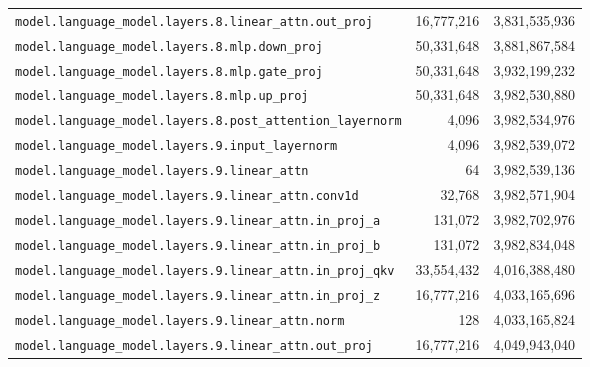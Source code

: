 \documentclass[10pt,a4paper]{article}
\theoremstyle{definition}
\begin{document}
\begin{appendices}
\begin{longtable}{p{9.5cm}rr}
\texttt{model.\allowbreak{}language\_model.\allowbreak{}layers.\allowbreak{}8.\allowbreak{}linear\_attn.\allowbreak{}out\_proj} & 16,777,216 & 3,831,535,936 \\
\texttt{model.\allowbreak{}language\_model.\allowbreak{}layers.\allowbreak{}8.\allowbreak{}mlp.\allowbreak{}down\_proj} & 50,331,648 & 3,881,867,584 \\
\texttt{model.\allowbreak{}language\_model.\allowbreak{}layers.\allowbreak{}8.\allowbreak{}mlp.\allowbreak{}gate\_proj} & 50,331,648 & 3,932,199,232 \\
\texttt{model.\allowbreak{}language\_model.\allowbreak{}layers.\allowbreak{}8.\allowbreak{}mlp.\allowbreak{}up\_proj} & 50,331,648 & 3,982,530,880 \\
\texttt{model.\allowbreak{}language\_model.\allowbreak{}layers.\allowbreak{}8.\allowbreak{}post\_attention\_layernorm} & 4,096 & 3,982,534,976 \\
\texttt{model.\allowbreak{}language\_model.\allowbreak{}layers.\allowbreak{}9.\allowbreak{}input\_layernorm} & 4,096 & 3,982,539,072 \\
\texttt{model.\allowbreak{}language\_model.\allowbreak{}layers.\allowbreak{}9.\allowbreak{}linear\_attn} & 64 & 3,982,539,136 \\
\texttt{model.\allowbreak{}language\_model.\allowbreak{}layers.\allowbreak{}9.\allowbreak{}linear\_attn.\allowbreak{}conv1d} & 32,768 & 3,982,571,904 \\
\texttt{model.\allowbreak{}language\_model.\allowbreak{}layers.\allowbreak{}9.\allowbreak{}linear\_attn.\allowbreak{}in\_proj\_a} & 131,072 & 3,982,702,976 \\
\texttt{model.\allowbreak{}language\_model.\allowbreak{}layers.\allowbreak{}9.\allowbreak{}linear\_attn.\allowbreak{}in\_proj\_b} & 131,072 & 3,982,834,048 \\
\texttt{model.\allowbreak{}language\_model.\allowbreak{}layers.\allowbreak{}9.\allowbreak{}linear\_attn.\allowbreak{}in\_proj\_qkv} & 33,554,432 & 4,016,388,480 \\
\texttt{model.\allowbreak{}language\_model.\allowbreak{}layers.\allowbreak{}9.\allowbreak{}linear\_attn.\allowbreak{}in\_proj\_z} & 16,777,216 & 4,033,165,696 \\
\texttt{model.\allowbreak{}language\_model.\allowbreak{}layers.\allowbreak{}9.\allowbreak{}linear\_attn.\allowbreak{}norm} & 128 & 4,033,165,824 \\
\texttt{model.\allowbreak{}language\_model.\allowbreak{}layers.\allowbreak{}9.\allowbreak{}linear\_attn.\allowbreak{}out\_proj} & 16,777,216 & 4,049,943,040 \\

\end{longtable}
\end{appendices}
\end{document}
